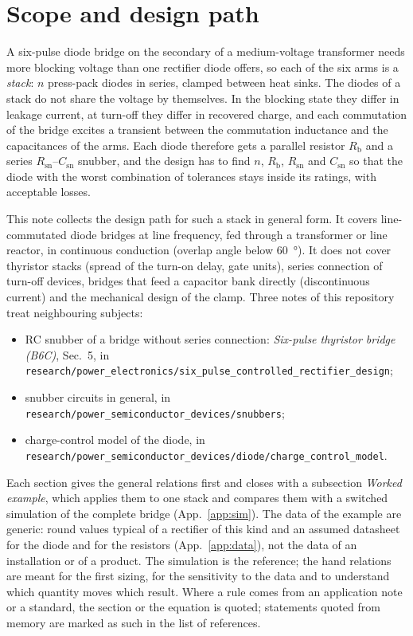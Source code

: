 \documentclass[10pt,a4paper]{scrartcl}
\newcommand{\Csn}{C_\mathrm{sn}}
\newcommand{\Rsn}{R_\mathrm{sn}}
\newcommand{\Rb}{R_\mathrm{b}}
\begin{document}

\tableofcontents
\newpage

\section{Scope and design path}
\label{sec:scope}
A six-pulse diode bridge on the secondary of a medium-voltage transformer needs more blocking voltage than one rectifier diode offers, so each of the six arms is a \emph{stack}: $n$ press-pack diodes in series, clamped between heat sinks. The diodes of a stack do not share the voltage by themselves. In the blocking state they differ in leakage current, at turn-off they differ in recovered charge, and each commutation of the bridge excites a transient between the commutation inductance and the capacitances of the arms. Each diode therefore gets a parallel resistor $\Rb$ and a series $\Rsn$--$\Csn$ snubber, and the design has to find $n$, $\Rb$, $\Rsn$ and $\Csn$ so that the diode with the worst combination of tolerances stays inside its ratings, with acceptable losses.

This note collects the design path for such a stack in general form. It covers line-commutated diode bridges at line frequency, fed through a transformer or line reactor, in continuous conduction (overlap angle below \SI{60}{\degree}). It does not cover thyristor stacks (spread of the turn-on delay, gate units), series connection of turn-off devices, bridges that feed a capacitor bank directly (discontinuous current) and the mechanical design of the clamp. Three notes of this repository treat neighbouring subjects:
\begin{itemize}
\item RC snubber of a bridge without series connection: \emph{Six-pulse thyristor bridge (B6C)}, Sec.~5, in\\ \texttt{research/power\_electronics/six\_pulse\_controlled\_rectifier\_design};
\item snubber circuits in general, in \texttt{research/power\_semiconductor\_devices/snubbers};
\item charge-control model of the diode, in\\ \texttt{research/power\_semiconductor\_devices/diode/charge\_control\_model}.
\end{itemize}

Each section gives the general relations first and closes with a subsection \emph{Worked example}, which applies them to one stack and compares them with a switched simulation of the complete bridge (App.~\ref{app:sim}). The data of the example are generic: round values typical of a rectifier of this kind and an assumed datasheet for the diode and for the resistors (App.~\ref{app:data}), not the data of an installation or of a product. The simulation is the reference; the hand relations are meant for the first sizing, for the sensitivity to the data and to understand which quantity moves which result. Where a rule comes from an application note or a standard, the section or the equation is quoted; statements quoted from memory are marked as such in the list of references.
\end{document}
